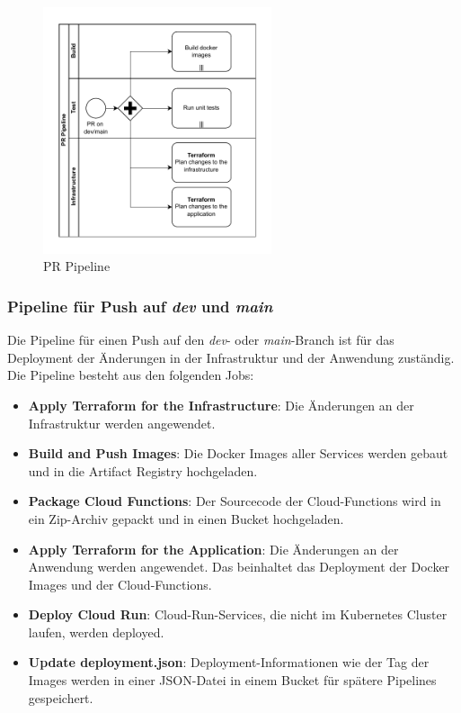\begin{figure}[H]
  \centering
  \includegraphics[width=0.6\textwidth]{resources/pr-pipeline.pdf}
  \caption{PR Pipeline}
  \label{fig:pr-pipeline}
\end{figure}


\subsubsection*{Pipeline für Push auf \textit{dev} und \textit{main}}

Die Pipeline für einen Push auf den \textit{dev}- oder \textit{main}-Branch ist für das 
Deployment der Änderungen in der Infrastruktur und der Anwendung zuständig.
Die Pipeline besteht aus den folgenden Jobs:

\begin{itemize}
  \item \textbf{Apply Terraform for the Infrastructure}: Die Änderungen an der Infrastruktur werden angewendet.
  \item \textbf{Build and Push Images}: Die Docker Images aller Services werden gebaut und in die Artifact Registry hochgeladen.
  \item \textbf{Package Cloud Functions}: Der Sourcecode der Cloud-Functions wird in ein Zip-Archiv gepackt und in einen Bucket hochgeladen.
  \item \textbf{Apply Terraform for the Application}: Die Änderungen an der Anwendung werden angewendet. Das beinhaltet das Deployment der Docker Images und der Cloud-Functions.
  \item \textbf{Deploy Cloud Run}: Cloud-Run-Services, die nicht im Kubernetes Cluster laufen, werden deployed.
  \item \textbf{Update deployment.json}: Deployment-Informationen wie der Tag der Images werden in einer JSON-Datei in einem Bucket für spätere Pipelines gespeichert.
\end{itemize}

